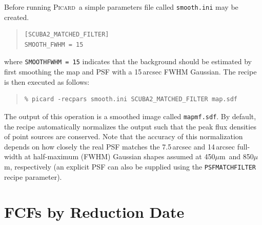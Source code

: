 \documentclass[twoside,11pt]{article}
\newcommand{\xref}[3]{#1}
\newcommand{\xlabel}[1]{}
\renewcommand{\_}{\texttt{\symbol{95}}}
\newcommand{\micron}{\mbox{$\mu$m}}
\newenvironment{myquote}{\begin{quote}\begin{small}}{\end{small}\end{quote}}
\newcommand{\picard}{\xref{\textsc{Picard}}{sun265}{}}
\newcommand{\param}[1]{\texttt{#1}}
\begin{document}
Before running \picard\, a simple parameters file called \texttt{smooth.ini}
may be created.
\begin{myquote}
\begin{verbatim}
[SCUBA2_MATCHED_FILTER]
SMOOTH_FWHM = 15
\end{verbatim}
\end{myquote}
%
where \texttt{SMOOTH\_FWHM = 15} indicates that the background should
be estimated by first smoothing the map and PSF with a 15\,arcsec FWHM
Gaussian. The recipe is then executed as follows:
%
\begin{myquote}
\begin{verbatim}
% picard -recpars smooth.ini SCUBA2_MATCHED_FILTER map.sdf
\end{verbatim}
\end{myquote}
%
The output of this operation is a smoothed image called
\texttt{map\_mf.sdf}. By default, the recipe automatically normalizes
the output such that the peak flux densities of point sources are
conserved. Note that the accuracy of this normalization depends on how
closely the real PSF matches the 7.5\,arcsec and 14\,arcsec full-width
at half-maximum (FWHM) Gaussian shapes assumed at 450\micron\ and
850\micron, respectively (an explicit PSF can also be supplied using
the \param{PSF\_MATCHFILTER} recipe parameter).



\section{\xlabel{fcfsred}FCFs by Reduction Date}
\label{app:fcfs}
\end{document}
